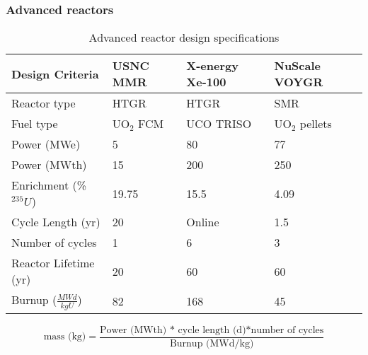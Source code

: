 \begin{frame}
    \frametitle{Advanced reactors}
    \vspace{-0.2cm}
    \begingroup
        \renewcommand{\arraystretch}{1.5}
        \begin{table}
            \small
            \caption{Advanced reactor design specifications}
            \label{tab:reactor_summary}
            \vspace{-0.15cm}
            \begin{tabular}{ l p{1.5cm} p{1.5cm} p{2cm} }
                \hline
                Design Criteria & USNC MMR 
                    \cite{noauthor_usnc_2021} & 
                    X-energy Xe-100 \cite{mulder_overview_2021} & 
                    NuScale VOYGR \cite{nuscale_chapter_2020-1,reyes_nuscale_2021,reyes_correction_2022}\\\hline
                Reactor type & HTGR & HTGR & SMR\\
                Fuel type & UO$_2$ FCM & UCO TRISO & UO$_2$ pellets \\
                Power (MWe) & 5 & 80 & 77\\
                Power (MWth) & 15 & 200 & 250\\
                Enrichment (\% $^{235}U$) & 19.75 & 15.5 & 4.09 \\
                Cycle Length (yr) & 20 & Online & 1.5 \\
                Number of cycles & 1 & 6 & 3\\
                Reactor Lifetime (yr) & 20 & 60 & 60\\
                Burnup ($\frac{MWd}{kg U}$) & 82 & 168 & 45\\
                \hline
            \end{tabular}
        \end{table}   
    \endgroup
    \begin{equation}
        \text{mass (kg)} = \frac{\text{Power (MWth) * cycle length (d)*number of cycles}}{\text{Burnup (MWd/kg)}}
        \label{eq:fuel_mass}
    \end{equation}
\end{frame}

